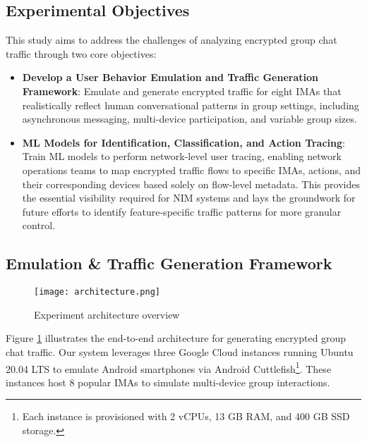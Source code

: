 \documentclass[conference]{IEEEtran}
\begin{document}
\subsection{Experimental Objectives}

This study aims to address the challenges of analyzing encrypted group chat traffic through two core objectives:

\begin{itemize}
    \item \textbf{Develop a User Behavior Emulation and Traffic Generation Framework}: Emulate and generate encrypted traffic for eight IMAs that realistically reflect human conversational patterns in group settings, including asynchronous messaging, multi-device participation, and variable group sizes.
    \item \textbf{ML Models for Identification, Classification, and Action Tracing}: Train ML models to perform network-level user tracing, enabling network operations teams to map encrypted traffic flows to specific IMAs, actions, and their corresponding devices based solely on flow-level metadata. This provides the essential visibility required for NIM systems and lays the groundwork for future efforts to identify feature-specific traffic patterns for more granular control.
\end{itemize}


\subsection{Emulation \& Traffic Generation Framework}\label{AA}

\begin{figure}[!ht]
    \centering
    \texttt{[image: architecture.png]}
    \caption{Experiment architecture overview}
    \label{fig:architecture}
\end{figure}

Figure \ref{fig:architecture} illustrates the end-to-end architecture for generating encrypted group chat traffic. Our system leverages three Google Cloud instances running Ubuntu 20.04 LTS to emulate Android smartphones via Android Cuttlefish\footnote{Each instance is provisioned with 2 vCPUs, 13 GB RAM, and 400 GB SSD storage.}. These instances host 8 popular IMAs to simulate multi-device group interactions.
\end{document}
